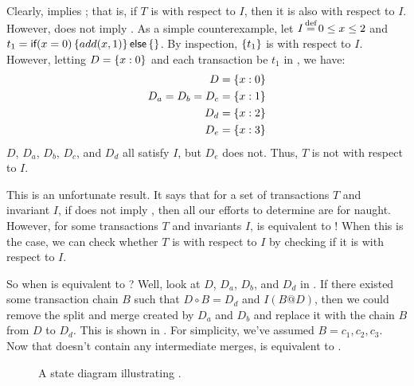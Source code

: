 Clearly, \iconfluence{} implies \liconfluence{}; that is, if $T$ is
\iconfluent{} with respect to $I$, then it is also \liconfluent{} with respect
to $I$. However, \liconfluence{} does not imply \iconfluence{}. As a simple
counterexample, let $I \defeq 0 \leq x \leq 2$ and $t_1 =
\textsf{if}(x=0)\left\{add(x,1)\right\}\textsf{else}\left\{\right\}$. By inspection, $\left\{t_1\right\}$ is \liconfluent{} with
respect to $I$. However, letting $D=\left\{x:0\right\}$ and each transaction be $t_1$ in
, we have:
\begin{align*}
  D   &= \left\{x:0\right\} \\
  D_a =
  D_b =
  D_c &= \left\{x:1\right\} \\
  D_d &= \left\{x:2\right\} \\
  D_e &= \left\{x:3\right\}
\end{align*}
$D$, $D_a$, $D_b$, $D_c$, and $D_d$ all satisfy $I$, but $D_e$ does not. Thus,
$T$ is not \iconfluent{} with respect to $I$.

This is an unfortunate result. It says that for a set of transactions $T$ and
invariant $I$, if \liconfluence{} does not imply \iconfluence{}, then all our
efforts to determine \liconfluence{} are for naught. However, for some
transactions $T$ and invariants $I$, \liconfluence{} is equivalent to
\iconfluence{}! When this is the case, we can check whether $T$ is
\iconfluent{} with respect to $I$ by checking if it is \liconfluent{} with
respect to $I$.

So when is \liconfluence{} equivalent to \iconfluence{}? Well, look at $D$,
$D_a$, $D_b$, and $D_d$ in . If there existed some
\imp{} transaction chain $B$ such that $D \circ B = D_d$ and $I(B@D)$, then we
could remove the split and merge created by $D_a$ and $D_b$ and replace it with
the chain $B$ from $D$ to $D_d$. This is shown in . For
simplicity, we've assumed $B = c_1, c_2, c_3$. Now that 
doesn't contain any intermediate merges, \liconfluence{} is equivalent to
\iconfluence{}.

\begin{figure}[h]
  \centering
  \caption{A state diagram illustrating \iconfluence{}.}
  \label{fig:mergeremoved}
\end{figure}


